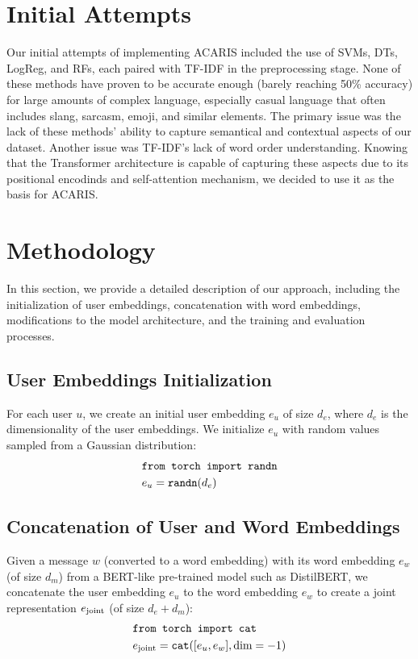 \documentclass{article}
\begin{document}
\begin{itemize}
\section{Initial Attempts}
Our initial attempts of implementing ACARIS included the use of SVMs, DTs, LogReg, and RFs, each paired with TF-IDF in the preprocessing stage. None of these methods have proven to be accurate enough (barely reaching 50\% accuracy) for large amounts of complex language, especially casual language that often includes slang, sarcasm, emoji, and similar elements. The primary issue was the lack of these methods' ability to capture semantical and contextual aspects of our dataset. Another issue was TF-IDF's lack of word order understanding. Knowing that the Transformer architecture is capable of capturing these aspects due to its positional encodinds and self-attention mechanism, we decided to use it as the basis for ACARIS.

\section{Methodology}
In this section, we provide a detailed description of our approach, including the initialization of user embeddings, concatenation with word embeddings, modifications to the model architecture, and the training and evaluation processes.

\subsection{User Embeddings Initialization}
For each user $u$, we create an initial user embedding $e_u$ of size $d_e$, where $d_e$ is the dimensionality of the user embeddings. We initialize $e_u$ with random values sampled from a Gaussian distribution:
\begin{equation}
\begin{aligned}
&\text{\texttt{from torch import randn}} \\
&e_u = \text{\texttt{randn}}(d_e)
\end{aligned}
\end{equation}

\subsection{Concatenation of User and Word Embeddings}
Given a message $w$ (converted to a word embedding) with its word embedding $e_w$ (of size $d_m$) from a BERT-like pre-trained model such as DistilBERT, we concatenate the user embedding $e_u$ to the word embedding $e_w$ to create a joint representation $e_\textnormal{joint}$ (of size $d_e + d_m$):
\begin{equation}
\begin{aligned}
&\text{\texttt{from torch import cat}} \\
&e_\textnormal{joint} = \textnormal{\texttt{cat}}([e_u, e_w], \textnormal{dim}=-1)
\end{aligned}
\end{equation}


\end{itemize}
\end{document}
